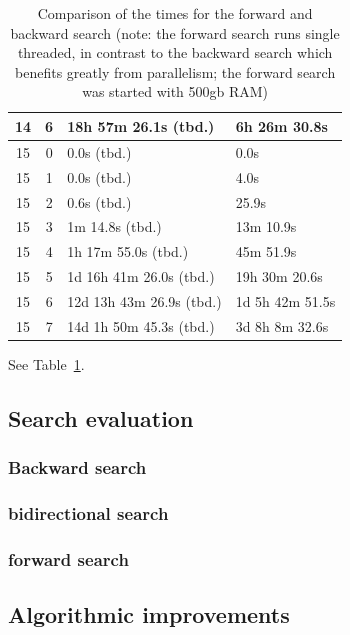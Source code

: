 \documentclass[10pt,journal,compsoc]{IEEEtran}
\begin{document}
\begin{table}[htbp]
\begin{tabular}{c|c|l|l}
    14         & 6          & 18h 57m 26.1s (tbd.)     & 6h 26m 30.8s             \\
    \hline
    15         & 0          & 0.0s (tbd.)              & 0.0s                     \\
    15         & 1          & 0.0s (tbd.)              & 4.0s                     \\
    15         & 2          & 0.6s (tbd.)              & 25.9s                    \\
    15         & 3          & 1m 14.8s (tbd.)          & 13m 10.9s                \\
    15         & 4          & 1h 17m 55.0s (tbd.)      & 45m 51.9s                \\
    15         & 5          & 1d 16h 41m 26.0s (tbd.)  & 19h 30m 20.6s            \\
    15         & 6          & 12d 13h 43m 26.9s (tbd.) & 1d 5h 42m 51.5s          \\
    15         & 7          & 14d 1h 50m 45.3s (tbd.)  & 3d 8h 8m 32.6s           \\
  \end{tabular}
  \centering
  \caption{Comparison of the times for the forward and backward search (note: the forward search runs single threaded, in contrast to the backward search which benefits greatly from parallelism; the forward search was started with 500gb RAM)}
  \label{table:search_algorithms}
\end{table}

See Table~\ref{table:search_algorithms}.

\subsection{Search evaluation}

\subsubsection{Backward search}
\subsubsection{bidirectional search}
\subsubsection{forward search}


\subsection{Algorithmic improvements}
\end{document}
